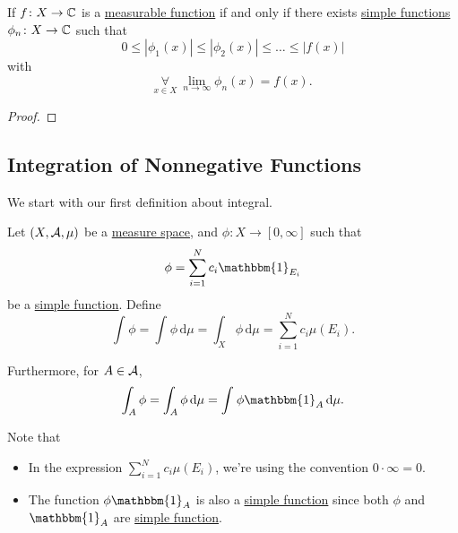 \begin{corollary}
	If \(f\colon X\to \mathbb{\MakeUppercase{c}} \) is a \hyperref[def:measurable-function]{measurable function} if and only if there exists
	\hyperref[def:simple-function]{simple functions} \(\phi _{n}\colon X\to \mathbb{\MakeUppercase{c}}\) such that
	\[
		0\leq \left\vert \phi _1(x) \right\vert \leq \left\vert \phi _2(x) \right\vert \leq \ldots \leq \left\vert f(x) \right\vert
	\]
	with
	\[
		\underset{x\in X}{\forall }\ \lim\limits_{n \to \infty} \phi _{n}(x) = f(x).
	\]
\end{corollary}
\begin{proof}
\end{proof}

\subsection{Integration of Nonnegative Functions}
We start with our first definition about integral.
\begin{definition}\label{def:integration-of-nonnegative-function}
	Let \((X, \mathcal{\MakeUppercase{a}}, \mu  )\) be a \hyperref[def:measure-space]{measure space}, and \(\phi\colon X\to [0, \infty ]\) such that
	\[
		\phi  = \sum\limits_{i=1}^{N} c_{i}\mathbbm{1}_{E_{i}}
	\]
	be a \hyperref[def:simple-function]{simple function}. Define
	\[
		\int_{}^{} \phi = \int_{}^{} \phi  \,\mathrm{d}\mu = \int_{X}^{} \phi  \,\mathrm{d}\mu = \sum\limits_{i=1}^{N} c_{i}\mu (E_{i}).
	\]

	\par Furthermore, for \(A\in \mathcal{\MakeUppercase{a}} \),
	\[
		\int_{A}^{} \phi = \int_{A}^{} \phi  \,\mathrm{d}\mu = \int_{}^{} \phi \mathbbm{1}_{A}  \,\mathrm{d}\mu.
	\]
\end{definition}
\begin{note}
	Note that
	\begin{itemize}
		\item In the expression \(\sum\limits_{i=1}^{N} c_{i}\mu (E_{i})\), we're using the convention \(0\cdot \infty = 0\).
		\item The function \(\phi \mathbbm{1}_{A} \) is also a \hyperref[def:simple-function]{simple function} since both \(\phi \) and
		      \(\mathbbm{1}_{A} \) are \hyperref[def:simple-function]{simple function}.
	\end{itemize}
\end{note}

